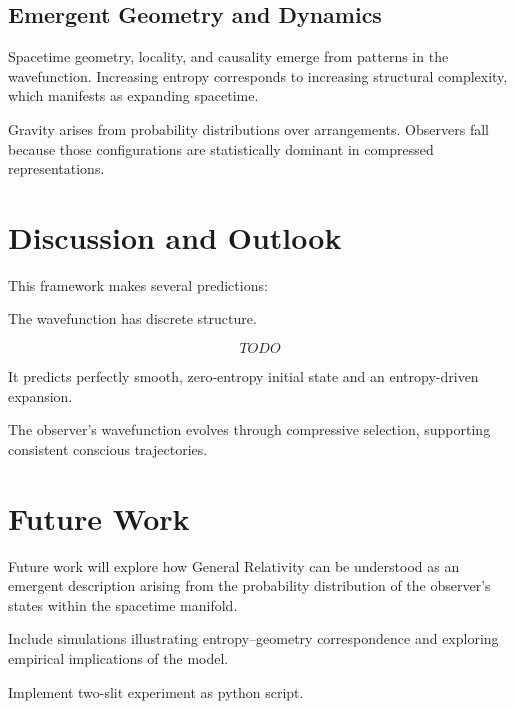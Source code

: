 \documentclass[11pt]{article}
\begin{document}
\subsection{Emergent Geometry and Dynamics}

Spacetime geometry, locality, and causality emerge from patterns in the wavefunction. Increasing entropy corresponds to increasing structural complexity, which manifests as expanding spacetime.

Gravity arises from probability distributions over arrangements. Observers fall because those configurations are statistically dominant in compressed representations.

\section{Discussion and Outlook}

This framework makes several predictions:

The wavefunction has discrete structure.

\[TODO\]

It predicts perfectly smooth, zero-entropy initial state and an entropy-driven expansion.

The observer’s wavefunction evolves through compressive selection, supporting consistent conscious trajectories.

\section {Future Work}

Future work will explore how General Relativity can be understood as an emergent description arising from the probability distribution of the observer’s states within the spacetime manifold.

Include simulations illustrating entropy–geometry correspondence and exploring empirical implications of the model.

Implement two-slit experiment as python script.

\printbibliography
\end{document}
